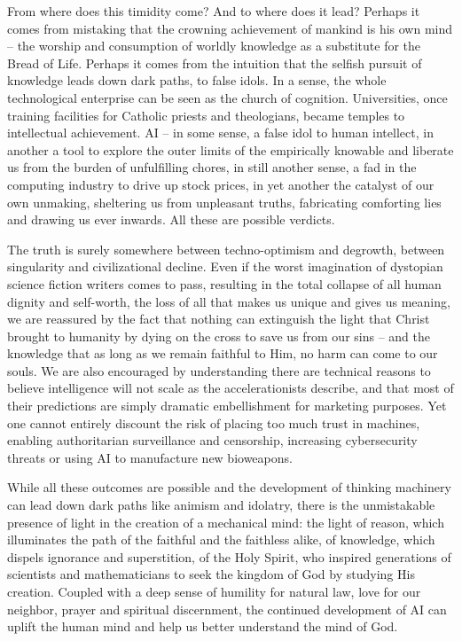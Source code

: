 \documentclass[sigplan,nonacm]{acmart}\settopmatter{printfolios=false,printccs=false,printacmref=false}
\begin{document}
From where does this timidity come? And to where does it lead? Perhaps it comes from mistaking that the crowning achievement of mankind is his own mind -- the worship and consumption of worldly knowledge as a substitute for the Bread of Life. Perhaps it comes from the intuition that the selfish pursuit of knowledge leads down dark paths, to false idols. In a sense, the whole technological enterprise can be seen as the church of cognition. Universities, once training facilities for Catholic priests and theologians, became temples to intellectual achievement. AI -- in some sense, a false idol to human intellect, in another a tool to explore the outer limits of the empirically knowable and liberate us from the burden of unfulfilling chores, in still another sense, a fad in the computing industry to drive up stock prices, in yet another the catalyst of our own unmaking, sheltering us from unpleasant truths, fabricating comforting lies and drawing us ever inwards. All these are possible verdicts.

The truth is surely somewhere between techno-optimism and degrowth, between singularity and civilizational decline. Even if the worst imagination of dystopian science fiction writers comes to pass, resulting in the total collapse of all human dignity and self-worth, the loss of all that makes us unique and gives us meaning, we are reassured by the fact that nothing can extinguish the light that Christ brought to humanity by dying on the cross to save us from our sins -- and the knowledge that as long as we remain faithful to Him, no harm can come to our souls. We are also encouraged by understanding there are technical reasons to believe intelligence will not scale as the accelerationists describe, and that most of their predictions are simply dramatic embellishment for marketing purposes. Yet one cannot entirely discount the risk of placing too much trust in machines, enabling authoritarian surveillance and censorship, increasing cybersecurity threats or using AI to manufacture new bioweapons.

While all these outcomes are possible and the development of thinking machinery can lead down dark paths like animism and idolatry, there is the unmistakable presence of light in the creation of a mechanical mind: the light of reason, which illuminates the path of the faithful and the faithless alike, of knowledge, which dispels ignorance and superstition, of the Holy Spirit, who inspired generations of scientists and mathematicians to seek the kingdom of God by studying His creation. Coupled with a deep sense of humility for natural law, love for our neighbor, prayer and spiritual discernment, the continued development of AI can uplift the human mind and help us better understand the mind of God.
\end{document}
